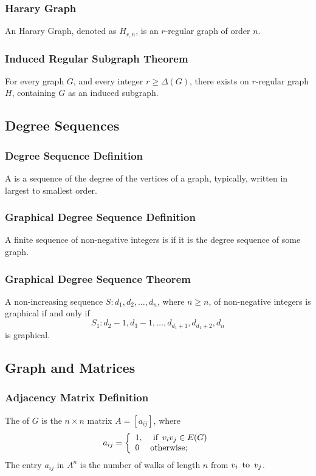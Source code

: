 \subsubsection*{Harary Graph}
An Harary Graph, denoted as $H_{r,n}$, is an $r$-regular graph of order $n$.

\subsubsection*{Induced Regular Subgraph Theorem}
For every graph $G$, and every integer $r \geq \Delta(G)$, there exists on $r$-regular graph $H$, containing $G$ as an induced subgraph.

\subsection{Degree Sequences}

\subsubsection*{Degree Sequence Definition}
A  is a sequence of the degree of the vertices of a graph, typically, written in largest to smallest order.

\subsubsection*{Graphical Degree Sequence Definition}
A finite sequence of non-negative integers is  if it is the degree sequence of some graph.

\subsubsection*{Graphical Degree Sequence Theorem}
A non-increasing sequence $S: d_1, d_2, \ldots, d_n$, where $n \geq n$, of non-negative integers is graphical if and only if
\[
    S_1: d_2 - 1, d_3 - 1, \ldots, d_{d_1 + 1}, d_{d_1 + 2}, d_n
\]
is graphical.

\subsection{Graph and Matrices}

\subsubsection*{Adjacency Matrix Definition}
The  of $G$ is the $n \times n$ matrix $A = [a_{ij}]$, where
\[
    a_{ij} = \left\{
    \begin{array}{ll}
        1, & \operatorname{~\text{if}~} v_iv_j \in E(G) \\
        0  & \text{otherwise};
    \end{array}
    \right.
\]
The entry $a_{ij}$ in $A^n$ is the number of walks of length $n$ from $v_i \operatorname{~\text{to}~} v_j$.